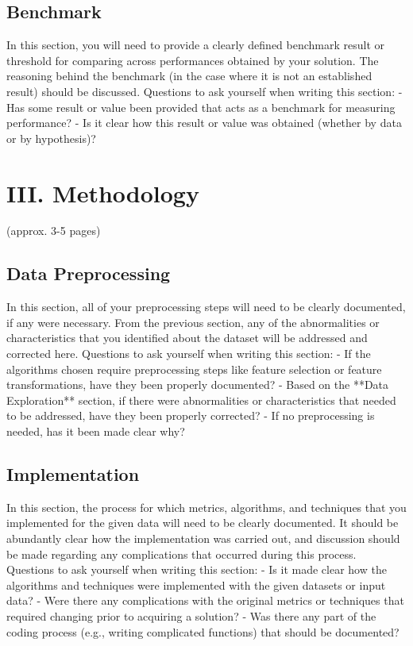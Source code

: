 \documentclass[12pt]{article}
\begin{document}
\subsection{Benchmark}
In this section, you will need to provide a clearly defined benchmark result or threshold for comparing across performances obtained by your solution. The reasoning behind the benchmark (in the case where it is not an established result) should be discussed. Questions to ask yourself when writing this section:
- Has some result or value been provided that acts as a benchmark for measuring performance?
- Is it clear how this result or value was obtained (whether by data or by hypothesis)?


\section{III. Methodology}
(approx. 3-5 pages)

\subsection{Data Preprocessing}
In this section, all of your preprocessing steps will need to be clearly documented, if any were necessary. From the previous section, any of the abnormalities or characteristics that you identified about the dataset will be addressed and corrected here. Questions to ask yourself when writing this section:
- If the algorithms chosen require preprocessing steps like feature selection or feature transformations, have they been properly documented?
- Based on the **Data Exploration** section, if there were abnormalities or characteristics that needed to be addressed, have they been properly corrected?
- If no preprocessing is needed, has it been made clear why?

\subsection{Implementation}
In this section, the process for which metrics, algorithms, and techniques that you implemented for the given data will need to be clearly documented. It should be abundantly clear how the implementation was carried out, and discussion should be made regarding any complications that occurred during this process. Questions to ask yourself when writing this section:
- Is it made clear how the algorithms and techniques were implemented with the given datasets or input data?
- Were there any complications with the original metrics or techniques that required changing prior to acquiring a solution?
- Was there any part of the coding process (e.g., writing complicated functions) that should be documented?
\end{document}
